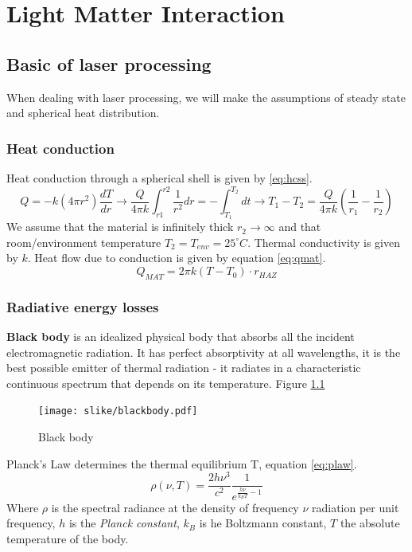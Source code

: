 \chapter{Light Matter Interaction}
\section{Basic of laser processing} %

When dealing with laser processing, we will make the assumptions of steady state and spherical heat distribution.

\subsection{Heat conduction}
Heat conduction through a spherical shell is given by \ref{eq:hcss}.
\begin{equation}
    Q = -k (4 \pi r^2)\frac{dT}{dr} \rightarrow \frac{Q}{4\pi k}\int_{r1}^{r2} \frac{1}{r^2} dr = -\int_{T_1}^{T_2} dt 
    \rightarrow T_1 - T_2 = \frac{Q}{4 \pi k} \left(\frac{1}{r_1} - \frac{1}{r_2} \right)
    \label{eq:hcss}
\end{equation}
We assume that the material is infinitely thick $r_2 \rightarrow \infty$ and that 
room/environment  temperature $T_2 = T_{env} = 25^{\circ} C$. Thermal conductivity is
given by $k$. Heat flow due to conduction is given by equation \ref{eq:qmat}.
\begin{equation}
    Q_{MAT} = 2\pi k (T-T_0) \cdot r_{HAZ}
    \label{eq:qmat}
\end{equation}

\subsection{Radiative energy losses}

\textbf{Black body} is an idealized physical body that absorbs all the incident electromagnetic radiation. 
It has perfect absorptivity at all wavelengths, it is the best possible emitter of thermal radiation - it radiates in a characteristic continuous 
spectrum that depends on its temperature. Figure \ref{fig:bb}
\begin{figure}[h!]
    \centering
    \texttt{[image: slike/blackbody.pdf]}
    \caption{Black body}
    \label{fig:bb}
\end{figure}
Planck's Law determines the thermal equilibrium T, equation \ref{eq:plaw}.
\begin{equation}
    \rho(\nu, T) = \frac{2 h \nu^3}{c^2} \frac{1}{e^{\frac{h\nu}{k_B T}-1}}
    \label{eq:plaw}
\end{equation}
Where $\rho$ is the spectral radiance at the density of frequency $\nu$ radiation per unit frequency,
$h$ is the \textit{Planck constant}, $k_B$ is he Boltzmann constant, $T$ the absolute temperature of the body.

